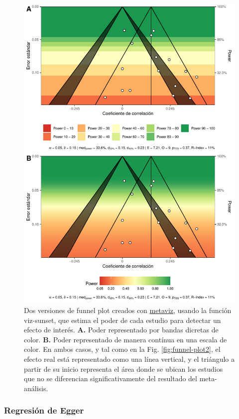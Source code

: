 \documentclass[
  bookmarksnumbered]{article}
\begin{document}
\begin{figure}
\centering
\includegraphics{Meta-analysis_files/figure-latex/funnel-plot3-1.pdf}
\caption{\label{fig:funnel-plot3}Dos versiones de funnel plot creados con \href{https://cran.r-project.org/web/packages/metaviz/vignettes/metaviz.html}{metaviz}, usando la función viz-sunset, que estima el poder de cada estudio para detectar un efecto de interés. \textbf{A.} Poder representado por bandas dicretas de color. \textbf{B.} Poder representado de manera contínua en una escala de color. En ambos casos, y tal como en la Fig. \ref{fig:funnel-plot2}, el efecto real está representado como una línea vertical, y el triángulo a partir de su inicio representa el área donde se ubican los estudios que no se diferencian significativamente del resultado del meta-análisis.}
\end{figure}

\hypertarget{reg-egger}{%
\subsubsection{Regresión de Egger}\label{reg-egger}}
\end{document}
